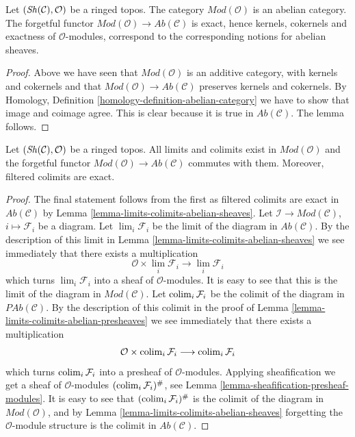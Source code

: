 \begin{lemma}
\label{lemma-abelian}
Let $(\mathop{\mathit{Sh}}\nolimits(\mathcal{C}), \mathcal{O})$ be a ringed topos.
The category $\textit{Mod}(\mathcal{O})$ is an abelian category.
The forgetful functor
$\textit{Mod}(\mathcal{O}) \to \textit{Ab}(\mathcal{C})$
is exact, hence kernels, cokernels and exactness of
$\mathcal{O}$-modules, correspond to the corresponding notions
for abelian sheaves.
\end{lemma}

\begin{proof}
Above we have seen that $\textit{Mod}(\mathcal{O})$ is an additive
category, with kernels and cokernels
and that $\textit{Mod}(\mathcal{O}) \to \textit{Ab}(\mathcal{C})$
preserves kernels and cokernels.
By Homology, Definition \ref{homology-definition-abelian-category}
we have to show that image and coimage agree. This is clear
because it is true in $\textit{Ab}(\mathcal{C})$. The lemma follows.
\end{proof}

\begin{lemma}
\label{lemma-limits-colimits}
Let $(\mathop{\mathit{Sh}}\nolimits(\mathcal{C}), \mathcal{O})$ be a ringed topos.
All limits and colimits exist in $\textit{Mod}(\mathcal{O})$
and the forgetful functor
$\textit{Mod}(\mathcal{O}) \to \textit{Ab}(\mathcal{C})$
commutes with them. Moreover, filtered colimits are exact.
\end{lemma}

\begin{proof}
The final statement follows from the first as filtered colimits are
exact in $\textit{Ab}(\mathcal{C})$ by
Lemma \ref{lemma-limits-colimits-abelian-sheaves}.
Let $\mathcal{I} \to \textit{Mod}(\mathcal{C})$, $i \mapsto \mathcal{F}_i$
be a diagram. Let $\lim_i \mathcal{F}_i$ be the limit of the diagram
in $\textit{Ab}(\mathcal{C})$. By the description of this limit in
Lemma \ref{lemma-limits-colimits-abelian-sheaves} we see immediately that
there exists a multiplication
$$
\mathcal{O} \times \lim_i \mathcal{F}_i
\longrightarrow
\lim_i \mathcal{F}_i
$$
which turns $\lim_i \mathcal{F}_i$ into a sheaf of
$\mathcal{O}$-modules. It is easy to see that this is the
limit of the diagram in $\textit{Mod}(\mathcal{C})$. Let
$\mathop{\mathrm{colim}}\nolimits_i \mathcal{F}_i$ be the colimit of the diagram
in $\textit{PAb}(\mathcal{C})$. By the description of this colimit
in the proof of Lemma \ref{lemma-limits-colimits-abelian-presheaves}
we see immediately that there exists a multiplication
$$
\mathcal{O} \times \mathop{\mathrm{colim}}\nolimits_i \mathcal{F}_i
\longrightarrow
\mathop{\mathrm{colim}}\nolimits_i \mathcal{F}_i
$$
which turns $\mathop{\mathrm{colim}}\nolimits_i \mathcal{F}_i$ into a presheaf of
$\mathcal{O}$-modules. Applying sheafification we get a
sheaf of $\mathcal{O}$-modules $(\mathop{\mathrm{colim}}\nolimits_i \mathcal{F}_i)^\#$,
see Lemma \ref{lemma-sheafification-presheaf-modules}.
It is easy to see that $(\mathop{\mathrm{colim}}\nolimits_i \mathcal{F}_i)^\#$
is the colimit of the diagram in $\textit{Mod}(\mathcal{O})$, and
by Lemma \ref{lemma-limits-colimits-abelian-sheaves}
forgetting the $\mathcal{O}$-module structure is
the colimit in $\textit{Ab}(\mathcal{C})$.
\end{proof}

